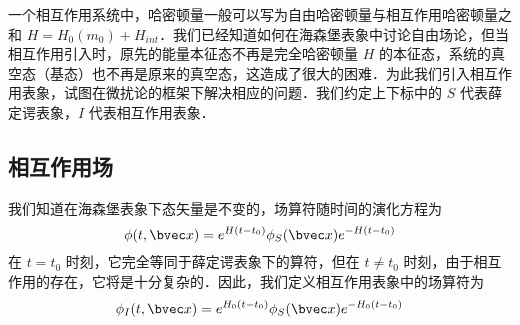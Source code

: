 
一个相互作用系统中，哈密顿量一般可以写为自由哈密顿量与相互作用哈密顿量之和 $H=H_0(m_0)+H_{int}$．我们已经知道如何在海森堡表象中讨论自由场论，但当相互作用引入时，原先的能量本征态不再是完全哈密顿量 $H$ 的本征态，系统的真空态（基态）也不再是原来的真空态，这造成了很大的困难．为此我们引入相互作用表象，试图在微扰论的框架下解决相应的问题．我们约定上下标中的 $S$ 代表薛定谔表象，$I$ 代表相互作用表象．
\subsection{相互作用场}
我们知道在海森堡表象下态矢量是不变的，场算符随时间的演化方程为
\begin{equation}
\phi(t,\bvec x)=e^{H(t-t_0)}\phi_S(\bvec x)e^{-H(t-t_0)}
\end{equation}
在 $t=t_0$ 时刻，它完全等同于薛定谔表象下的算符，但在 $t\neq t_0$ 时刻，由于相互作用的存在，它将是十分复杂的．因此，我们定义相互作用表象中的场算符为
\begin{equation}
\phi_I(t,\bvec x)=e^{H_0(t-t_0)}\phi_S(\bvec x)e^{-H_0(t-t_0)}
\end{equation}

